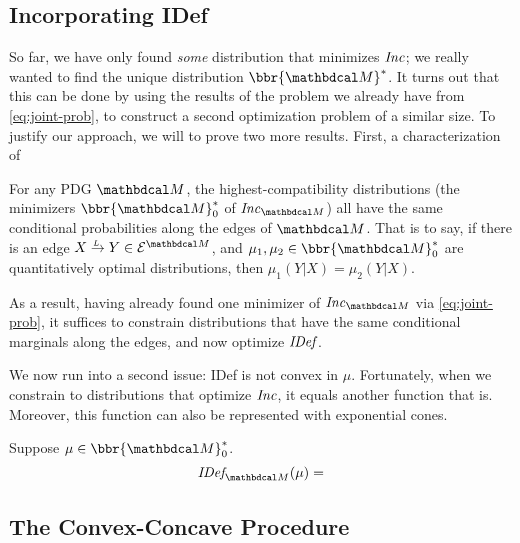 \documentclass[twoside]{article}
\begin{document}
\subsection{Incorporating IDef}


So far, we have only found \emph{some} distribution that minimizes $\mathit{Inc}$; 
we really wanted to find the unique distribution $\bbr{\dg M}^*$.
It turns out that this can be done by using the results of the problem we already have from \eqref{eq:joint-prob}, to construct a second optimization problem of a similar size.
To justify our approach, we will to prove two more results.
First, a characterization of 

\begin{prop}\label{prop:marginonly}
	For any PDG $\dg M$, 
	the highest-compatibility distributions (the minimizers $\bbr{\dg M}_0^*$ of $\Inc_{\dg M}$) all have the same conditional probabilities along the edges of $\dg M$.   
	That is to say, if there is an edge $\ed LXY \in \Ed^{\dg M}$, and $\mu_1, \mu_2 \in \bbr{\dg M}_0^*$ are quantitatively optimal distributions, then $\mu_1(Y|X) = \mu_2(Y|X)$.  
\end{prop}

As a result, having already found one minimizer of $\Inc_{\dg M}$ via \eqref{eq:joint-prob}, it suffices to constrain distributions that have the same conditional marginals along the edges, and now optimize $\mathit{IDef}_{\!}$. 

We now run into a second issue: IDef is not convex in $\mu$. 
Fortunately, when we constrain to distributions that optimize $\mathit{Inc}$, 
it equals another function that is. 
Moreover, this function can also be represented with exponential cones.

Suppose $\mu \in \bbr{\dg M}_0^*$.
\[
    \IDef{\dg M}(\mu) = 
\]

\subsection{The Convex-Concave Procedure}

\end{document}
